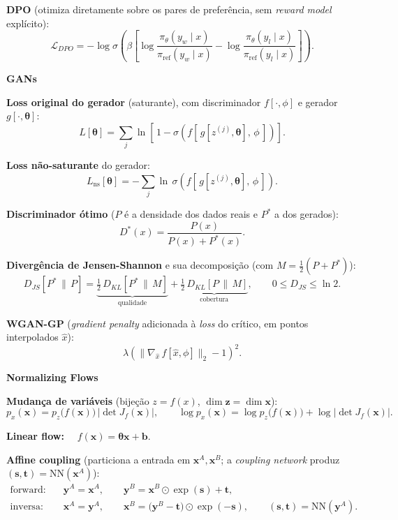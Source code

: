 \documentclass[11pt,a4paper]{article}
\newcommand{\thetav}{\boldsymbol{\theta}}
\newcommand{\bloco}[1]{%
  \par\vspace{0.3em}%
  {\bfseries\large #1}\par%
  \vspace{-0.4em}{\color{gray!60}\rule{\linewidth}{0.4pt}}\par%
}
\begin{document}
\textbf{DPO} (otimiza diretamente sobre os pares de preferência, sem \textit{reward model} explícito):
\[
  \mathcal{L}_{DPO} = -\log \sigma\!\left(\beta\left[\log\frac{\pi_\theta(y_w \mid x)}{\pi_{\text{ref}}(y_w \mid x)} - \log\frac{\pi_\theta(y_l \mid x)}{\pi_{\text{ref}}(y_l \mid x)}\right]\right).
\]

\bloco{GANs}

\textbf{Loss original do gerador} (saturante), com discriminador $f[\cdot,\phi]$ e gerador $g[\cdot,\thetav]$:
\[
  L[\thetav] = \sum_{j} \ln\!\left[\, 1 - \sigma\!\left(f\!\left[\,g[z^{(j)},\thetav],\,\phi\,\right]\right)\right].
\]

\textbf{Loss não-saturante} do gerador:
\[
  L_{\text{ns}}[\thetav] = -\sum_{j} \ln\,\sigma\!\left(f\!\left[\,g[z^{(j)},\thetav],\,\phi\,\right]\right).
\]

\textbf{Discriminador ótimo} ($P$ é a densidade dos dados reais e $P^{*}$ a dos gerados):
\[
  D^{*}(x) = \frac{P(x)}{P(x) + P^{*}(x)}.
\]

\textbf{Divergência de Jensen-Shannon} e sua decomposição (com $M = \tfrac{1}{2}(P + P^{*})$):
\[
  D_{JS}[P^{*}\,\|\,P]
  = \underbrace{\tfrac{1}{2}\,D_{KL}[P^{*}\,\|\,M]}_{\text{qualidade}}
  + \underbrace{\tfrac{1}{2}\,D_{KL}[P\,\|\,M]}_{\text{cobertura}},
  \qquad 0 \le D_{JS} \le \ln 2.
\]

\textbf{WGAN-GP} (\textit{gradient penalty} adicionada à \emph{loss} do crítico, em pontos interpolados $\hat{x}$):
\[
  \lambda\left(\bigl\lVert \nabla_{\hat{x}}\, f[\hat{x},\phi]\bigr\rVert_{2} - 1\right)^{2}.
\]

\bloco{Normalizing Flows}

\textbf{Mudança de variáveis} (bijeção $z = f(x)$, $\dim \mathbf{z} = \dim \mathbf{x}$):
\[
  p_x(\mathbf{x}) = p_z\bigl(f(\mathbf{x})\bigr)\,\bigl|\det J_f(\mathbf{x})\bigr|,
  \qquad
  \log p_x(\mathbf{x}) = \log p_z\bigl(f(\mathbf{x})\bigr) + \log\bigl|\det J_f(\mathbf{x})\bigr|.
\]

\textbf{Linear flow:} $\quad f(\mathbf{x}) = \boldsymbol{\theta}\mathbf{x} + \mathbf{b}$.

\textbf{Affine coupling} (particiona a entrada em $\mathbf{x}^{A}, \mathbf{x}^{B}$; a \textit{coupling network} produz $(\mathbf{s},\mathbf{t}) = \mathrm{NN}(\mathbf{x}^{A})$):
\begin{align*}
  \text{forward:}\quad
  &\mathbf{y}^{A} = \mathbf{x}^{A}, \qquad
  \mathbf{y}^{B} = \mathbf{x}^{B} \odot \exp(\mathbf{s}) + \mathbf{t}, \\[0.2em]
  \text{inversa:}\quad
  &\mathbf{x}^{A} = \mathbf{y}^{A}, \qquad
  \mathbf{x}^{B} = \bigl(\mathbf{y}^{B} - \mathbf{t}\bigr) \odot \exp(-\mathbf{s}),
  \qquad (\mathbf{s},\mathbf{t}) = \mathrm{NN}(\mathbf{y}^{A}).
\end{align*}
\end{document}

